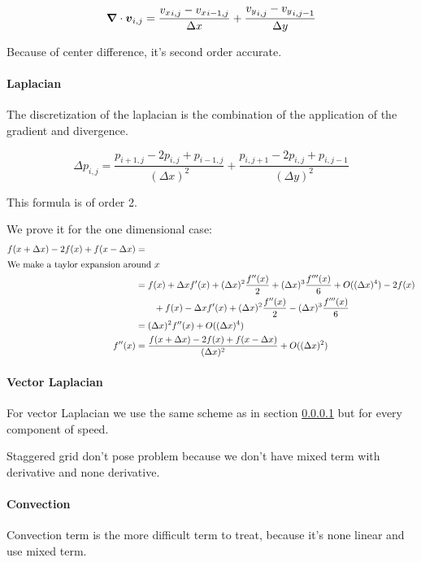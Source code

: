 \begin{equation}
	{\boldsymbol {\nabla}}\cdot {\boldsymbol {v}}_{i,j}=\frac{{v_{x}}_{i,j}-{v_{x}}_{i-1,j}}{\Delta x}+\frac{{v_{y}}_{i,j}-{v_{y}}_{i,j-1}}{\Delta y}
\end{equation}

Because of center difference, it's second order accurate.

\paragraph{Laplacian}
\label{fixed:Laplacian}
The discretization of the laplacian is the combination of the application of the gradient and divergence.

\begin{equation}
  \Delta p_{i,j}=\frac{p_{i+1,j}-2p_{i,j}+p_{i-1,j}}{(\Delta x)^2}+\frac{p_{i,j+1}-2p_{i,j}+p_{i,j-1}}{(\Delta y)^2}
\end{equation}

This formula is of order 2.

We prove it for the one dimensional case:
\begin{align*}
  f(x+\Delta x)-2f(x)+f(x-\Delta x)&=\\
  \intertext{We make a taylor expansion around $x$}
  &=f(x)+\Delta x f'(x) +(\Delta x)^2 \frac{f''(x)}{2}+(\Delta x)^3 \frac{f'''(x)}{6}+O((\Delta x)^4)-2f(x)\\
  &\qquad+f(x)-\Delta x f'(x) +(\Delta x)^2 \frac{f''(x)}{2}-(\Delta x)^3 \frac{f'''(x)}{6}\\
  &=(\Delta x)^2f''(x) +O((\Delta x)^4)\\
  f''(x)&=\frac{f(x+\Delta x)-2f(x)+f(x-\Delta x)}{(\Delta x)^2}+O((\Delta x)^2)
\end{align*}

\paragraph{Vector Laplacian}
For vector Laplacian we use the same scheme as in section \ref{fixed:Laplacian} but for every component of speed.

Staggered grid don't pose problem because we don't have mixed term with derivative and none derivative.

\paragraph{Convection}

Convection term is the more difficult term to treat, because it's none linear and use mixed term.

